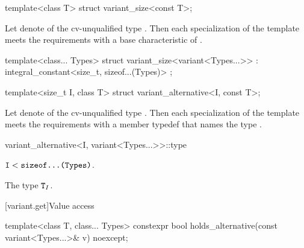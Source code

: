 %
\begin{itemdecl}
template<class T> struct variant_size<const T>;
\end{itemdecl}

\begin{itemdescr}
\pnum
Let  denote  of the cv-unqualified
type . Then each specialization of the template meets the
 requirements with a
base characteristic of .
\end{itemdescr}

%
\begin{itemdecl}
template<class... Types>
  struct variant_size<variant<Types...>> : integral_constant<size_t, sizeof...(Types)> { };
\end{itemdecl}

%
\begin{itemdecl}
template<size_t I, class T> struct variant_alternative<I, const T>;
\end{itemdecl}

\begin{itemdescr}
\pnum
Let  denote  of the
cv-unqualified type . Then each specialization of the template
meets the  requirements with a
member typedef  that names the type .
\end{itemdescr}

%
\begin{itemdecl}
variant_alternative<I, variant<Types...>>::type
\end{itemdecl}

\begin{itemdescr}
\pnum
\mandates
$\tcode{I} < \tcode{sizeof...(Types)}$.

\pnum
\result
The type $\tcode{T}_I$.
\end{itemdescr}

[variant.get]{Value access}

\begin{itemdecl}
template<class T, class... Types>
  constexpr bool holds_alternative(const variant<Types...>& v) noexcept;
\end{itemdecl}

